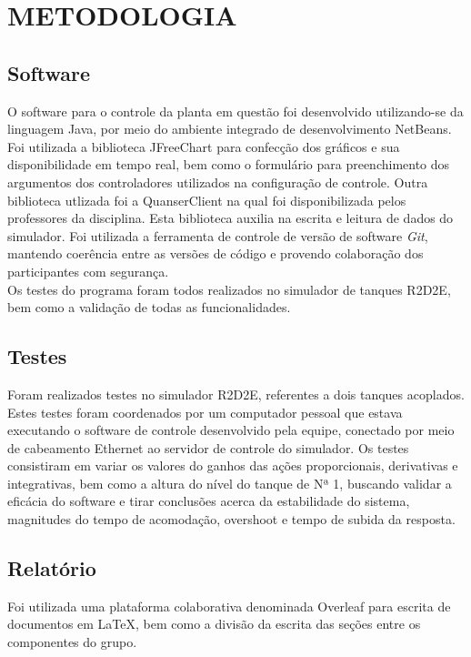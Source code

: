 \documentclass[a4paper,12pt]{article}
\begin{document}
\newpage


\thispagestyle{main}

\section{METODOLOGIA}

\subsection{Software}
\hspace{4ex} O software para o controle da planta em questão foi desenvolvido utilizando-se da linguagem Java, por meio do ambiente integrado de desenvolvimento NetBeans. Foi utilizada a biblioteca JFreeChart para confecção dos gráficos e sua disponibilidade em tempo real, bem como o formulário para preenchimento dos argumentos dos controladores utilizados na configuração de controle. Outra biblioteca utlizada foi a QuanserClient na qual foi disponibilizada pelos professores da disciplina. Esta biblioteca auxilia na escrita e leitura de dados do simulador. Foi utilizada a ferramenta de controle de versão de software \textit{Git}, mantendo coerência entre as versões de código e provendo colaboração dos participantes com segurança.\\

\hspace{4ex}Os testes do programa foram todos realizados no simulador de tanques R2D2E, bem como a valida\c{c}\~{a}o de todas as funcionalidades.

\subsection{Testes}
\hspace{4ex}Foram realizados testes no simulador R2D2E, referentes a dois tanques acoplados. Estes testes foram coordenados por um computador pessoal que estava executando o software de controle desenvolvido pela equipe, conectado por meio de cabeamento Ethernet ao servidor de controle do simulador. Os testes consistiram em variar os valores do ganhos das ações proporcionais, derivativas e integrativas, bem como a altura do nível do tanque de Nª 1, buscando validar a eficácia do software e tirar conclusões acerca da estabilidade do sistema, magnitudes do tempo de acomodação, overshoot e tempo de subida da resposta.

\subsection{Relatório}
\hspace{4ex}Foi utilizada uma plataforma colaborativa denominada Overleaf para escrita de documentos em \LaTeX , bem como a divisão da escrita das seções entre os componentes do grupo.
\end{document}

